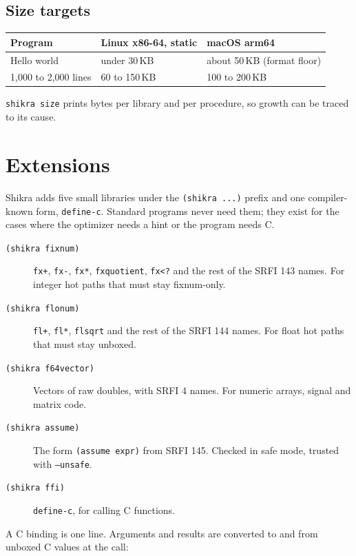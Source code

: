 \documentclass[a4paper,11pt]{article}
\begin{document}
\subsection{Size targets}

\begin{center}
\begin{tabular}{lll}
\hline
Program & Linux x86-64, static & macOS arm64 \\
\hline
Hello world & under 30\,KB & about 50\,KB (format floor) \\
1,000 to 2,000 lines & 60 to 150\,KB & 100 to 200\,KB \\
\hline
\end{tabular}
\end{center}

\texttt{shikra size} prints bytes per library and per procedure, so growth
can be traced to its cause.

\section{Extensions}

Shikra adds five small libraries under the \texttt{(shikra ...)} prefix and
one compiler-known form, \texttt{define-c}. Standard programs never need
them; they exist for the cases where the optimizer needs a hint or the
program needs C.

\begin{description}
\item[\texttt{(shikra fixnum)}] \texttt{fx+}, \texttt{fx-}, \texttt{fx*},
  \texttt{fxquotient}, \texttt{fx<?} and the rest of the SRFI 143 names. For
  integer hot paths that must stay fixnum-only.
\item[\texttt{(shikra flonum)}] \texttt{fl+}, \texttt{fl*}, \texttt{flsqrt}
  and the rest of the SRFI 144 names. For float hot paths that must stay
  unboxed.
\item[\texttt{(shikra f64vector)}] Vectors of raw doubles, with SRFI 4
  names. For numeric arrays, signal and matrix code.
\item[\texttt{(shikra assume)}] The form \texttt{(assume expr)} from
  SRFI 145. Checked in safe mode, trusted with \texttt{--unsafe}.
\item[\texttt{(shikra ffi)}] \texttt{define-c}, for calling C functions.
\end{description}

A C binding is one line. Arguments and results are converted to and from
unboxed C values at the call:
\end{document}
